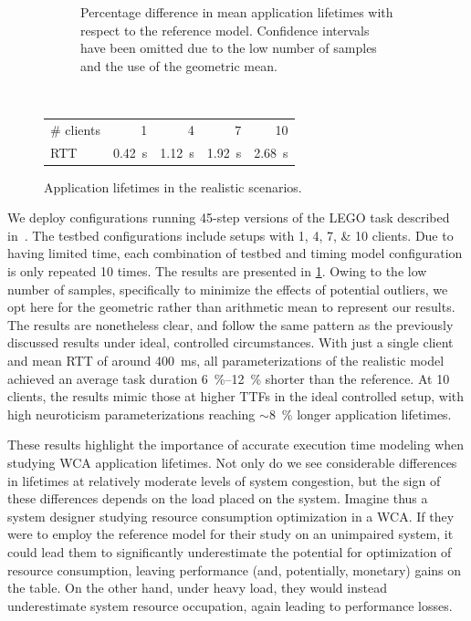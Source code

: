 \begin{figure}
\begin{subfigure}[t]{.45\textwidth}
        \caption{%
            Percentage difference in mean application lifetimes with respect to the reference model.
            Confidence intervals have been omitted due to the low number of samples and the use of the geometric mean.
        }
    \end{subfigure}\\
    \bigskip
    \begin{subtable}{\textwidth}
        \centering
        \begin{tabular}{lrrrr}
            \toprule
            \# clients & 1 & 4 & 7 & 10 \\
            \gls{RTT} & \SI{0.42}{\second} & \SI{1.12}{\second} & \SI{1.92}{\second} & \SI{2.68}{\second} \\
            \bottomrule
        \end{tabular}
        \caption{Mean measured \glspl{RTT} for each testbed configuration.}
    \end{subtable}
    \caption{Application lifetimes in the realistic scenarios.}\label{fig:testbed_lifetimes}
\end{figure}

We deploy configurations running \num{45}-step versions of the LEGO task described in~\cite{olguinmunoz2021impact}.
The testbed configurations include setups with \numlist{1;4;7;10} clients.
Due to having limited time, each combination of testbed and timing model configuration is only repeated \num{10} times.
The results are presented in \cref{fig:testbed_lifetimes}.
Owing to the low number of samples, specifically to minimize the effects of potential outliers, we opt here for the geometric rather than arithmetic mean to represent our results.
The results are nonetheless clear, and follow the same pattern as the previously discussed results under ideal, controlled circumstances.
With just a single client and mean \gls{RTT} of around \SI{400}{\milli\second}, all parameterizations of the realistic model achieved an average task duration \SIrange{6}{12}{\percent} shorter than the reference.
At \num{10} clients, the results mimic those at higher \glspl{TTF} in the ideal controlled setup, with high neuroticism parameterizations reaching \ensuremath{\sim}\SI{8}{\percent} longer application lifetimes.

These results highlight the importance of accurate execution time modeling when studying \gls{WCA} application lifetimes.
Not only do we see considerable differences in lifetimes at relatively moderate levels of system congestion, but the sign of these differences depends on the load placed on the system.
Imagine thus a system designer studying resource consumption optimization in a \gls{WCA}.
If they were to employ the reference model for their study on an unimpaired system, it could lead them to significantly underestimate the potential for optimization of resource consumption, leaving performance (and, potentially, monetary) gains on the table.
On the other hand, under heavy load, they would instead underestimate system resource occupation, again leading to performance losses.

